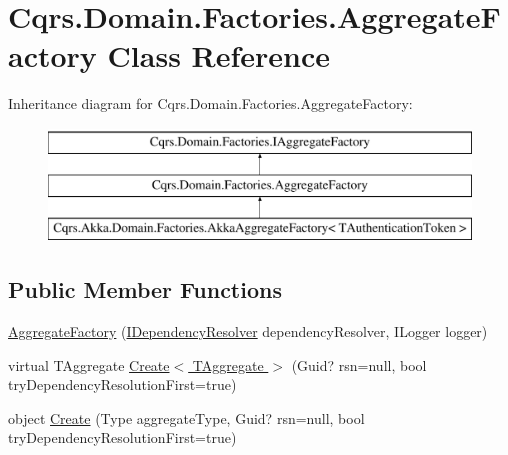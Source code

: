 \hypertarget{classCqrs_1_1Domain_1_1Factories_1_1AggregateFactory}{}\section{Cqrs.\+Domain.\+Factories.\+Aggregate\+Factory Class Reference}
\label{classCqrs_1_1Domain_1_1Factories_1_1AggregateFactory}
Inheritance diagram for Cqrs.\+Domain.\+Factories.\+Aggregate\+Factory\+:\begin{figure}[H]
\begin{center}
\leavevmode
\includegraphics[height=3.000000cm]{classCqrs_1_1Domain_1_1Factories_1_1AggregateFactory}
\end{center}
\end{figure}
\subsection*{Public Member Functions}
\begin{DoxyCompactItemize}
\item 
\hyperlink{classCqrs_1_1Domain_1_1Factories_1_1AggregateFactory_a8731bed6c8a8594c17bf0d32ff83939a_a8731bed6c8a8594c17bf0d32ff83939a}{Aggregate\+Factory} (\hyperlink{interfaceCqrs_1_1Configuration_1_1IDependencyResolver}{I\+Dependency\+Resolver} dependency\+Resolver, I\+Logger logger)
\item 
virtual T\+Aggregate \hyperlink{classCqrs_1_1Domain_1_1Factories_1_1AggregateFactory_ac155d6c1e55ba37bacf420185b652092_ac155d6c1e55ba37bacf420185b652092}{Create$<$ T\+Aggregate $>$} (Guid? rsn=null, bool try\+Dependency\+Resolution\+First=true)
\item 
object \hyperlink{classCqrs_1_1Domain_1_1Factories_1_1AggregateFactory_a917794af09bb3f51629e7abc231f8441_a917794af09bb3f51629e7abc231f8441}{Create} (Type aggregate\+Type, Guid? rsn=null, bool try\+Dependency\+Resolution\+First=true)
\end{DoxyCompactItemize}
